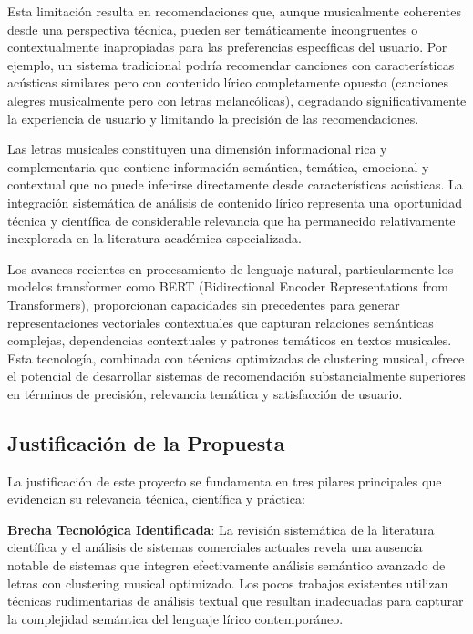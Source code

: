 \documentclass[12pt,a4paper]{article}
\begin{document}
Esta limitación resulta en recomendaciones que, aunque musicalmente coherentes desde una perspectiva técnica, pueden ser temáticamente incongruentes o contextualmente inapropiadas para las preferencias específicas del usuario. Por ejemplo, un sistema tradicional podría recomendar canciones con características acústicas similares pero con contenido lírico completamente opuesto (canciones alegres musicalmente pero con letras melancólicas), degradando significativamente la experiencia de usuario y limitando la precisión de las recomendaciones.

Las letras musicales constituyen una dimensión informacional rica y complementaria que contiene información semántica, temática, emocional y contextual que no puede inferirse directamente desde características acústicas. La integración sistemática de análisis de contenido lírico representa una oportunidad técnica y científica de considerable relevancia que ha permanecido relativamente inexplorada en la literatura académica especializada.

Los avances recientes en procesamiento de lenguaje natural, particularmente los modelos transformer como BERT (Bidirectional Encoder Representations from Transformers), proporcionan capacidades sin precedentes para generar representaciones vectoriales contextuales que capturan relaciones semánticas complejas, dependencias contextuales y patrones temáticos en textos musicales. Esta tecnología, combinada con técnicas optimizadas de clustering musical, ofrece el potencial de desarrollar sistemas de recomendación substancialmente superiores en términos de precisión, relevancia temática y satisfacción de usuario.

\subsection{Justificación de la Propuesta}

La justificación de este proyecto se fundamenta en tres pilares principales que evidencian su relevancia técnica, científica y práctica:

\textbf{Brecha Tecnológica Identificada}: La revisión sistemática de la literatura científica y el análisis de sistemas comerciales actuales revela una ausencia notable de sistemas que integren efectivamente análisis semántico avanzado de letras con clustering musical optimizado. Los pocos trabajos existentes utilizan técnicas rudimentarias de análisis textual que resultan inadecuadas para capturar la complejidad semántica del lenguaje lírico contemporáneo.
\end{document}
